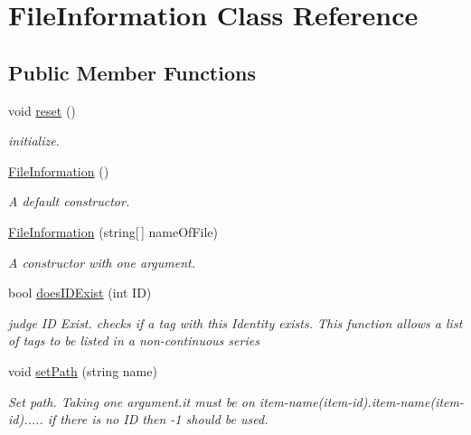 \hypertarget{class_file_information}{}\section{File\+Information Class Reference}
\label{class_file_information}
\subsection*{Public Member Functions}
\begin{DoxyCompactItemize}
\item 
void \mbox{\hyperlink{class_file_information_a5e19ac29cfc7a806e3af6b346a02578a}{reset}} ()
\begin{DoxyCompactList}\small\item\em initialize. \end{DoxyCompactList}\item 
\mbox{\label{class_file_information_ada73aa01f63bbe5b451f791923e06bcd}} 
\mbox{\hyperlink{class_file_information_ada73aa01f63bbe5b451f791923e06bcd}{File\+Information}} ()
\begin{DoxyCompactList}\small\item\em A default constructor. \end{DoxyCompactList}\item 
\mbox{\hyperlink{class_file_information_ae72cab35d7d963bfbe8dafc210ee2988}{File\+Information}} (string\mbox{[}$\,$\mbox{]} name\+Of\+File)
\begin{DoxyCompactList}\small\item\em A constructor with one argument. \end{DoxyCompactList}\item 
bool \mbox{\hyperlink{class_file_information_a4560ca8eebcef612a9e562f1cca644e8}{does\+I\+D\+Exist}} (int ID)
\begin{DoxyCompactList}\small\item\em judge ID Exist. checks if a tag with this Identity exists. This function allows a list of tags to be listed in a non-\/continuous series \end{DoxyCompactList}\item 
void \mbox{\hyperlink{class_file_information_a8ff7c5f71980bfc78f2790d552345f52}{set\+Path}} (string name)
\begin{DoxyCompactList}\small\item\em Set path. Taking one argument.\+it must be on item-\/name(item-\/id).item-\/name(item-\/id)..... if there is no ID then -\/1 should be used. \end{DoxyCompactList}\item 

\end{DoxyCompactItemize}
